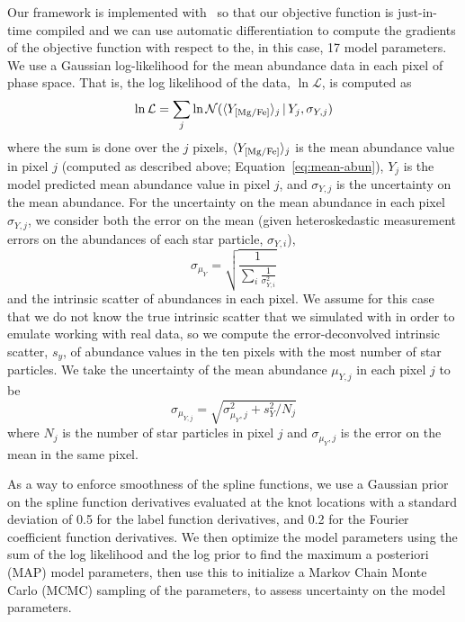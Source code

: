 Our framework is implemented with \jax\ so that our objective function is just-in-time
compiled and we can use automatic differentiation to compute the gradients of the
objective function with respect to the, in this case, 17 model parameters.
We use a Gaussian log-likelihood for the mean  abundance data in each pixel
of phase space.
That is, the log likelihood of the data, $\ln \mathcal{L}$, is computed as
\begin{equation}
    \ln \mathcal{L} = \sum_j \ln
        \mathcal{N}(\langle Y_{{[\mathrm{Mg}/\mathrm{Fe}]}} \rangle_j \,|\, Y_j, \sigma_{Y, j})
\end{equation}
where the sum is done over the $j$ pixels, $\langle Y_{{[\mathrm{Mg}/\mathrm{Fe}]}} \rangle_j$ is the
mean abundance value in pixel $j$ (computed as described above;
Equation~\ref{eq:mean-abun}), $Y_j$ is the model predicted mean abundance value in pixel
$j$, and $\sigma_{Y, j}$ is the uncertainty on the mean abundance.
For the uncertainty on the mean abundance in each pixel $\sigma_{Y, j}$, we consider
both the error on the mean (given heteroskedastic measurement errors on the abundances
of each star particle, $\sigma_{Y,i}$),
\begin{equation}
    \sigma_{\mu_Y} = \sqrt{\frac{1}{\sum_i \frac{1}{\sigma^2_{Y,i}}}}
\end{equation}
and the intrinsic scatter of abundances in each pixel.
We assume for this case that we do not know the true intrinsic scatter that we simulated
with in order to emulate working with real data, so we compute the error-deconvolved
intrinsic scatter, $s_y$, of abundance values in the ten pixels with the most number of
star particles.
We take the uncertainty of the mean abundance $\mu_{Y,j}$ in each pixel $j$ to be
\begin{equation}
    \sigma_{\mu_{Y,j}} = \sqrt{\sigma_{\mu_Y, j}^2 + s_Y^2 / N_j}
\end{equation}
where $N_j$ is the number of star particles in pixel $j$ and $\sigma_{\mu_Y, j}$ is the
error on the mean in the same pixel.

As a way to enforce smoothness of the spline functions, we use a Gaussian prior on the
spline function derivatives evaluated at the knot locations with a standard deviation of
0.5 for the label function derivatives, and 0.2 for the Fourier coefficient function
derivatives.
We then optimize the model parameters using the sum of the log likelihood and the log
prior to find the maximum a posteriori (MAP) model parameters, then use this to
initialize a Markov Chain Monte Carlo (MCMC) sampling of the parameters, to assess
uncertainty on the model parameters.

